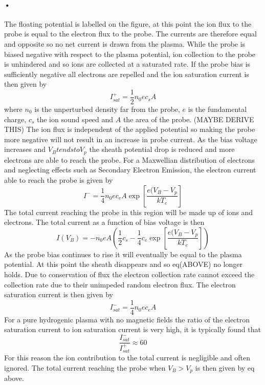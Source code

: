\documentclass[12pt]{article}
\def\be{\begin{equation}}
\def\ee{\end{equation}}
\begin{document}
\paragraph{•}
The floating potential is labelled on the figure, at this point the ion flux to the probe is equal to the electron flux to the probe. The currents are therefore equal and opposite so no net current is drawn from the plasma. While the probe is biased negative with respect to the plasma potential, ion collection to the probe is unhindered and so ions are collected at a saturated rate. If the probe bias is sufficiently negative all electrons are repelled and the ion saturation current is then given by 
\be 
I^{+}_{sat} = \frac{1}{2} n_0 e c_s A 
\ee
where $n_0$ is the unperturbed density far from the probe, $e$ is the fundamental charge, $c_s$ the ion sound speed and $A$ the area of the probe. (MAYBE DERIVE THIS) 
The ion flux is independent of the applied potential so making the probe more negative will not result in an increase in probe current. As the bias voltage increases and $V_B tends to V_p$ the sheath potential drop is reduced and more electrons are able to reach the probe. For a Maxwellian distribution of electrons and neglecting effects such as Secondary Electron Emission, the electron current able to reach the probe is given by 
\be 
I^{-} = \frac{1}{4} n_0 e c_e A \exp\left[\frac{e(V_B-V_p}{k T_e}\right]
\ee
The total current reaching the probe in this region will be made up of ions and electrons. The total current as a function of bias voltage is then 
\be 
I(V_B) = - n_0 e A\left(\frac{1}{2} c_s - \frac{1}{4}  c_e \exp\left[\frac{e(V_B-V_p}{k T_e}\right] \right)
\ee
As the probe bias continues to rise it will eventually be equal to the plasma potential. At this point the sheath disappears and so eq(ABOVE) no longer holds. Due to conservation of flux the electron collection rate cannot exceed the collection rate due to their unimpeded random electron flux. 
The electron saturation current is then given by 
\be  
I^{-}_{sat} = \frac{1}{4} n_0 e c_e A 
\ee
For a pure hydrogenic plasma with no magnetic fields the ratio of the electron saturation current to ion saturation current is very high, it is typically found that 
\be 
\frac{I^{-}_{sat}}{I^{+}_{sat}} \approx 60
\ee
For this reason the ion contribution to the total current is negligible and often ignored. The total current reaching the probe when $V_B > V_p$ is then given by eq above. 
\end{document}

